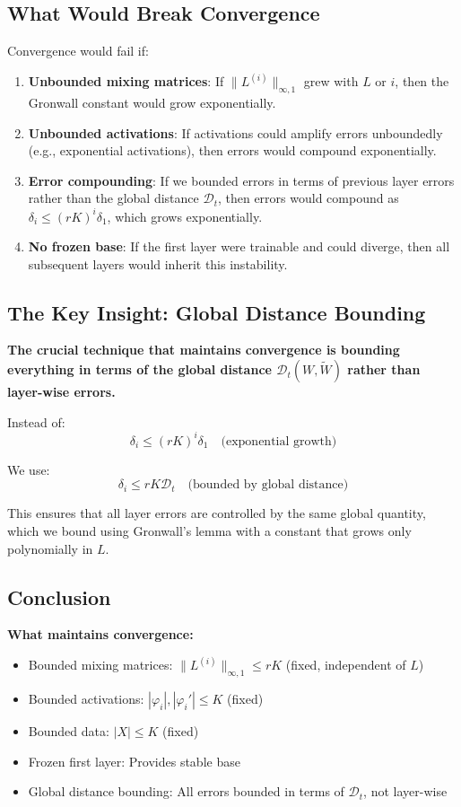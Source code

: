 \subsection{What Would Break Convergence}

Convergence would fail if:

\begin{enumerate}
\item \textbf{Unbounded mixing matrices}: If $\|L^{(i)}\|_{\infty,1}$ grew with $L$ or $i$, then the Gronwall constant would grow exponentially.

\item \textbf{Unbounded activations}: If activations could amplify errors unboundedly (e.g., exponential activations), then errors would compound exponentially.

\item \textbf{Error compounding}: If we bounded errors in terms of previous layer errors rather than the global distance $\mathscr{D}_t$, then errors would compound as $\delta_i \le (rK)^i \delta_1$, which grows exponentially.

\item \textbf{No frozen base}: If the first layer were trainable and could diverge, then all subsequent layers would inherit this instability.
\end{enumerate}

\subsection{The Key Insight: Global Distance Bounding}

\textbf{The crucial technique that maintains convergence is bounding everything in terms of the global distance $\mathscr{D}_t(W, \tilde{W})$ rather than layer-wise errors.}

Instead of:
\[
\delta_i \le (rK)^i \delta_1 \quad \text{(exponential growth)}
\]

We use:
\[
\delta_i \le rK \mathscr{D}_t \quad \text{(bounded by global distance)}
\]

This ensures that all layer errors are controlled by the same global quantity, which we bound using Gronwall's lemma with a constant that grows only polynomially in $L$.

\subsection{Conclusion}

\textbf{What maintains convergence:}
\begin{itemize}
\item Bounded mixing matrices: $\|L^{(i)}\|_{\infty,1} \le rK$ (fixed, independent of $L$)
\item Bounded activations: $|\varphi_i|, |\varphi_i'| \le K$ (fixed)
\item Bounded data: $|X| \le K$ (fixed)
\item Frozen first layer: Provides stable base
\item Global distance bounding: All errors bounded in terms of $\mathscr{D}_t$, not layer-wise
\end{itemize}

